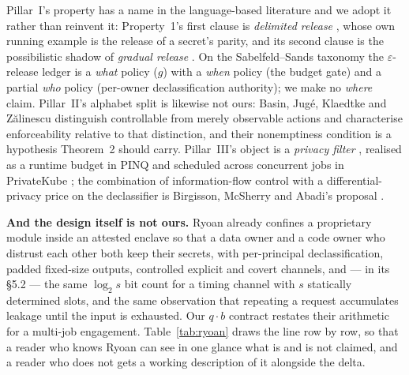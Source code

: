 \documentclass[11pt,a4paper]{article}
\begin{document}
Pillar~I's property has a name in the language-based literature and we adopt it rather than reinvent it: Property~1's first
clause is \emph{delimited release} \cite{sm03}, whose own running example is the release of a secret's parity, and its second
clause is the possibilistic shadow of \emph{gradual release} \cite{as07}. On the Sabelfeld--Sands taxonomy \cite{ss09} the
$\varepsilon$-release ledger is a \emph{what} policy ($g$) with a \emph{when} policy (the budget gate) and a partial \emph{who}
policy (per-owner declassification authority); we make no \emph{where} claim. Pillar~II's alphabet split is likewise not ours:
Basin, Jug\'e, Klaedtke and Z\u{a}linescu \cite{bjkz13} distinguish controllable from merely observable actions and characterise
enforceability relative to that distinction, and their nonemptiness condition is a hypothesis Theorem~2 should carry. Pillar~III's
object is a \emph{privacy filter} \cite{rruv16}, realised as a runtime budget in PINQ \cite{pinq09} and scheduled across
concurrent jobs in PrivateKube \cite{pkube21}; the combination of information-flow control with a differential-privacy price on
the declassifier is Birgisson, McSherry and Abadi's proposal \cite{bma11}.

\textbf{And the design itself is not ours.} Ryoan \cite{ryoan16} already confines a proprietary module inside an attested enclave
so that a data owner and a code owner who distrust each other both keep their secrets, with per-principal declassification, padded
fixed-size outputs, controlled explicit and covert channels, and --- in its \S5.2 --- the same $\log_2 s$ bit count for a
timing channel with $s$ statically determined slots, and the same observation that repeating a request accumulates leakage until
the input is exhausted. Our $q\cdot b$ contract restates their arithmetic for a multi-job engagement. Table~\ref{tab:ryoan} draws the
line row by row, so that a reader who knows Ryoan can see in one glance what is and is not claimed, and a reader who does not gets
a working description of it alongside the delta.
\end{document}
